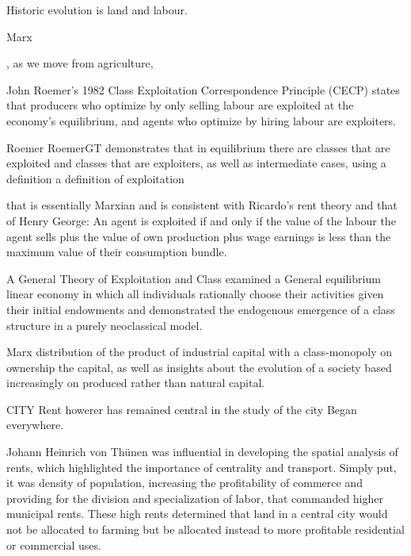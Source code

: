 Historic evolution is land and labour.

Marx


, as we move from agriculture, 





John Roemer’s 1982 Class Exploitation Correspondence Principle (CECP) states that producers who optimize by only selling labour are exploited at the economy’s equilibrium, and agents who optimize by hiring labour are exploiters.

Roemer
RoemerGT demonstrates that in equilibrium there are classes that are exploited and classes that are exploiters, as well as intermediate cases, using  a definition a definition of exploitation 

that is essentially Marxian and is consistent with Ricardo's rent theory and that of Henry George: 
%
An agent is exploited  if and only if the value of the labour the agent sells plus the value of own production plus wage earnings is less than the maximum value of their consumption bundle.
%
%

A General Theory of Exploitation and Class examined a General equilibrium linear economy in which all individuals rationally choose their  activities given their initial endowments and demonstrated  the endogenous emergence of a class structure in a purely neoclassical model. 

Marx
distribution of the product of industrial capital with a class-monopoly on ownership the capital,  as well as insights about the evolution of a society based increasingly on produced rather than natural capital. 



CITY
Rent howerer has remained central in the study of the city
Began everywhere.

Johann Heinrich von Th\"unen was influential in developing the spatial analysis of rents, which highlighted the importance of centrality and transport. Simply put, it was density of population, increasing the profitability of commerce and providing for the division and specialization of labor, that commanded higher municipal rents. These high rents determined that land in a central city would not be allocated to farming but be allocated instead to more profitable residential or commercial uses. 


